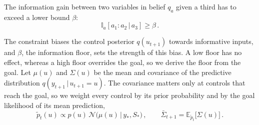 \documentclass{l4dc2027}
\def\cN{\mathcal{N}}
\newcommand\given[1][]{\,#1\vert\,}
\newcommand{\E}{\mathbb{E}}
\begin{document}
\begin{definition} \label{def:info}
The information gain between two variables in belief $q_a$ given a third has to exceed a lower bound $\beta$:
\begin{equation} \label{eq:info-constraint}
	\mathbb{I}_{a}[a_1 : a_2 \given a_3] \geq \beta \, .
\end{equation}
\end{definition}
%
The constraint biases the control posterior $q(u_{t+1})$ towards informative inputs, and $\beta$, the information floor, sets the strength of this bias. A low floor has no effect, whereas a high floor overrides the goal, so we derive the floor from the goal. 
Let $\mu(u)$ and $\Sigma(u)$ be the mean and covariance of the predictive distribution $q(y_{t+1} \given u_{t+1} = u)$. The covariance matters only at controls that reach the goal, so we weight every control by its prior probability and by the goal likelihood of its mean prediction,
\begin{equation}\label{eq:goal-weights}
	\tilde{p}_t(u) \propto p(u)\, \cN\big(\mu(u) \given y_*, S_*\big) \, , \qquad \bar{\Sigma}_{t+1} = \E_{\tilde{p}_t}\big[\Sigma(u)\big] \, .
\end{equation}
\end{document}
